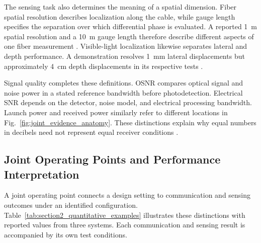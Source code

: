 The sensing task also determines the meaning of a spatial dimension.
Fiber spatial resolution describes localization along the cable, while gauge
length specifies the separation over which differential phase is evaluated.
A reported 1~m spatial resolution and a 10~m gauge length therefore describe
different aspects of one fiber measurement \cite{OISAC_SCR00057}.
Visible-light localization likewise separates lateral and depth performance.
A demonstration resolves 1~mm lateral displacements but approximately 4~cm
depth displacements in its respective tests \cite{OISAC_SCR00196}.

Signal quality completes these definitions. OSNR compares optical signal and
noise power in a stated reference bandwidth before photodetection. Electrical
SNR depends on the detector, noise model, and electrical processing bandwidth.
Launch power and received power similarly refer to different locations in
Fig.~\ref{fig:joint_evidence_anatomy}. These distinctions explain why equal
numbers in decibels need not represent equal receiver conditions
\cite{OISAC_SCR00220,OISAC_SCR01180}.

\subsection{Joint Operating Points and Performance Interpretation}
\label{sec:joint_performance_interpretation}

A joint operating point connects a design setting to communication and
sensing outcomes under an identified configuration.
Table~\ref{tab:section2_quantitative_examples} illustrates these distinctions
with reported values from three systems. Each communication and sensing
result is accompanied by its own test conditions.

